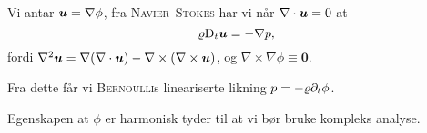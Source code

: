 Vi antar $\bm{u} = \nabla\phi$, fra \textsc{Navier}--\textsc{Stokes} har vi når $\nabla\cdot\bm{u} = 0$ at
\[
\varrho \mathrm{D}_t \bm{u} = -\nabla p,
\]
fordi $\nabla^2 \bm{u} = \nabla(\nabla\cdot\bm{u}) - \nabla\times(\nabla\times\bm{u})$, og $\nabla\times\nabla\phi \equiv \bm{0}$.
\vspace{2em}

Fra dette får vi \textsc{Bernoulli}s lineariserte likning $p = -\varrho\partial_t\phi$.

\vspace{2em}
Egenskapen at $\phi$ er harmonisk tyder til at vi bør bruke kompleks analyse.
